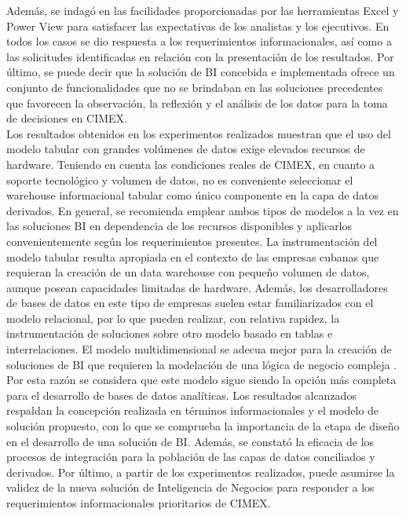 \documentclass[preprint,12pt]{elsarticle}
\begin{document}
Además,  se  indagó  en  las facilidades proporcionadas por las herramientas  Excel y Power View para satisfacer las  expectativas de los analistas y los ejecutivos. En todos los casos se dio respuesta a los requerimientos informacionales, así como a las solicitudes identificadas en relación con la presentación de los resultados. Por último, se puede decir que la solución de BI concebida e implementada ofrece un conjunto de funcionalidades que no se brindaban en  las soluciones precedentes que  favorecen la observación, la  reflexión y el  análisis de los datos para la toma de decisiones en CIMEX. \\ 
Los resultados  obtenidos en  los experimentos realizados  muestran que  el uso  del modelo  tabular con grandes volúmenes  de datos exige  elevados recursos de  hardware. Teniendo  en cuenta las  condiciones reales de CIMEX, en cuanto a soporte tecnológico y volumen de datos, no es conveniente seleccionar el warehouse informacional tabular como único componente en la capa de datos derivados. En general, se recomienda emplear ambos tipos de modelos a la vez en las soluciones BI en dependencia de los recursos disponibles y aplicarlos convenientemente según los requerimientos presentes.  La  instrumentación  del  modelo  tabular  resulta  apropiada  en  el  contexto  de  las  empresas  cubanas  que requieran la creación de un data warehouse con pequeño volumen de datos, aunque posean capacidades limitadas de  hardware. Además,  los desarrolladores de  bases de datos en este tipo  de empresas  suelen estar  familiarizados  con  el  modelo  relacional,  por  lo  que  pueden  realizar,  con  relativa  rapidez,  la instrumentación  de  soluciones  sobre  otro  modelo  basado  en  tablas  e  interrelaciones.  El  modelo multidimensional se adecua mejor para la creación de soluciones de BI que requieren la modelación de una lógica de negocio compleja . \\
Por esta razón se considera que este modelo sigue siendo la opción más completa para el desarrollo de bases de datos analíticas.   Los resultados alcanzados respaldan la  concepción realizada en  términos informacionales y el  modelo  de solución propuesto, con lo que se comprueba la importancia de la etapa de diseño en  el desarrollo de una solución de BI. Además, se constató la eficacia de los procesos de integración para la población de las capas de datos conciliados y derivados. Por último, a partir de los experimentos realizados, puede asumirse la validez de la nueva solución de Inteligencia de Negocios para responder a los requerimientos informacionales prioritarios de CIMEX. 
\end{document}
